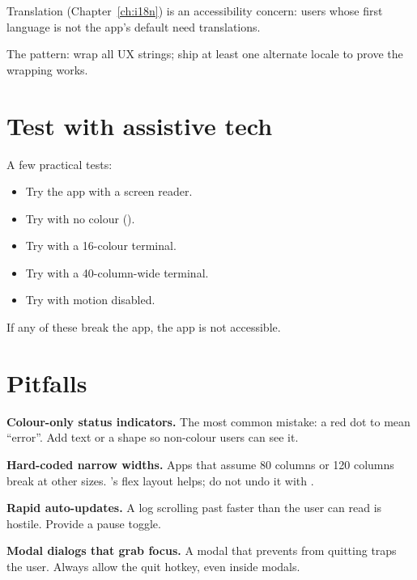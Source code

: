 Translation (Chapter~\ref{ch:i18n}) is an accessibility
concern: users whose first language is not the app's default
need translations.

The pattern: wrap all UX strings; ship at least one alternate
locale to prove the wrapping works.

\section{Test with assistive tech}

A few practical tests:

\begin{itemize}[leftmargin=*]
  \item Try the app with a screen reader.
  \item Try with no colour ().
  \item Try with a 16-colour terminal.
  \item Try with a 40-column-wide terminal.
  \item Try with motion disabled.
\end{itemize}

If any of these break the app, the app is not accessible.

\section{Pitfalls}

\begin{warning}
\textbf{Colour-only status indicators.} The most common
mistake: a red dot to mean ``error''. Add text or a shape so
non-colour users can see it.
\end{warning}

\begin{warning}
\textbf{Hard-coded narrow widths.} Apps that assume 80 columns
or 120 columns break at other sizes. \maya{}'s flex layout
helps; do not undo it with .
\end{warning}

\begin{warning}
\textbf{Rapid auto-updates.} A log scrolling past faster than
the user can read is hostile. Provide a pause toggle.
\end{warning}

\begin{warning}
\textbf{Modal dialogs that grab focus.} A modal that prevents
 from quitting traps the user. Always allow the
quit hotkey, even inside modals.
\end{warning}

